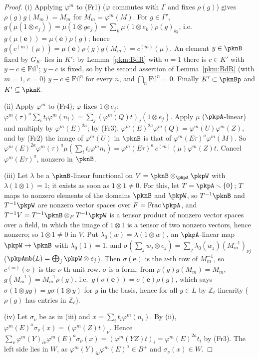 \documentclass[10pt]{amsart}
\theoremstyle{definition}
\theoremstyle{remark}
\newcommand{\Z}{\mathbb Z}
\begin{document}
\begin{proof}
(i) Applying $\varphi^m$ to (Fr1) ($\varphi$ commutes with $\Gamma$ and fixes $\rho(g)$) gives
$\rho(g)g(M_m)=M_m$ for $M_m=\varphi^m(M)$. For $g\in\Gamma'$, $g(\mu(1\otimes e_j))=\mu(1\otimes ge_j)=
\sum_k\mu(1\otimes e_k)\rho(g)_{kj}$, i.e.\ $g(\mu(\mathbf e))=\mu(\mathbf e)\rho(g)$; hence
$g(c^{(m)}(\mu))=\mu(\mathbf e)\rho(g)g(M_m)=c^{(m)}(\mu)$. An element $y\in\pknB$ fixed by $G_{K'}$ lies in
$K'$: by Lemma~\ref{pkm:BdR} with $n=1$ there is $c\in K'$ with $y-c\in\mathrm{Fil}^1$; $y-c$ is fixed, so
by the second assertion of Lemma~\ref{pkm:BdR} (with $m=1$, $c=0$) $y-c\in\mathrm{Fil}^n$ for every $n$,
and $\bigcap_n\mathrm{Fil}^n=0$. Finally $K'\subset\pknBp$ and $K'\subseteq\pknK$.

(ii) Apply $\varphi^m$ to (Fr4); $\varphi$ fixes $1\otimes e_j$: $\varphi^m(\tau)^a\sum_it_i\varphi^m(n_i)=
\sum_j(\varphi^m(Q)t)_j(1\otimes e_j)$. Apply $\mu$ ($\pkpA$-linear) and multiply by
$\varphi^m(E)^{2a}$; by (Fr3), $\varphi^m(E)^{2a}\varphi^m(Q)=\varphi^m(U)\varphi^m(Z)$, and by (Fr2) the
image of $\varphi^m(U)$ in $\pknB$ is that of $\varphi^m(E\tau)^a\varphi^m(M)$. So
$\varphi^m(E)^{2a}\varphi^m(\tau)^a\mu(\sum_it_i\varphi^m n_i)=\varphi^m(E\tau)^a\,c^{(m)}(\mu)\varphi^m(Z)t$.
Cancel $\varphi^m(E\tau)^a$, nonzero in $\pknB$.

(iii) Let $\lambda$ be a $\pknB$-linear functional on $V=\pknB\otimes_{\pkpA}\pkpW$ with $\lambda(1\otimes1)
=1$; it exists as soon as $1\otimes1\ne0$. For this, let $T=\pkpA\smallsetminus\{0\}$; $T$ maps to
nonzero elements of the domains $\pknB$ and $\pkpW$, so $T^{-1}\pknB$ and $T^{-1}\pkpW$ are nonzero vector
spaces over $F=\operatorname{Frac}\pkpA$, and $T^{-1}V=T^{-1}\pknB\otimes_FT^{-1}\pkpW$ is a tensor product of nonzero vector spaces over a
field, in which the image of $1\otimes1$ is a tensor of two nonzero vectors, hence nonzero; so
$1\otimes1\ne0$ in $V$. Put $\lambda_0(w)=\lambda(1\otimes w)$, an
$\pkpA$-linear map $\pkpW\to\pknB$ with $\lambda_0(1)=1$, and $\sigma(\sum_jw_j\otimes e_j)=\sum_j
\lambda_0(w_j)(M_m^{-1})_{\nu j}$ ($\pkpAmb(L)=\bigoplus_j\pkpW\otimes e_j$). Then $\sigma(\mathbf e)$ is
the $\nu$-th row of $M_m^{-1}$, so $c^{(m)}(\sigma)$ is the $\nu$-th unit row. $\sigma$ is a form: from
$\rho(g)g(M_m)=M_m$, $g(M_m^{-1})=M_m^{-1}\rho(g)$, i.e.\ $g(\sigma(\mathbf e))=\sigma(\mathbf e)\rho(g)$,
which says $\sigma(1\otimes gy)=g\sigma(1\otimes y)$ for $y$ in the basis, hence for all $y\in L$ by
$\Z_\ell$-linearity ($\rho(g)$ has entries in $\Z_\ell$).

(iv) Let $\sigma_\nu$ be as in (iii) and $x=\sum_it_i\varphi^m(n_i)$. By (ii),
$\varphi^m(E)^a\sigma_\nu(x)=(\varphi^m(Z)t)_\nu$. Hence
$\sum_\nu\varphi^m(Y)_{i\nu}\allowbreak \varphi^m(E)^a\sigma_\nu(x)=(\varphi^m(YZ)t)_i=\varphi^m(E)^{2a}t_i$ by (Fr3).
The left side lies in $W$, as $\varphi^m(Y)_{i\nu}\varphi^m(E)^a\in B^+$ and $\sigma_\nu(x)\in W$.
\end{proof}
\end{document}
